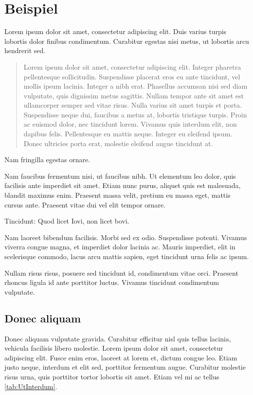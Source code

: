 \chapter{Beispiel} \label{ch:Beispiel}
Lorem ipsum dolor sit amet, consectetur adipiscing elit. Duis varius turpis lobortis dolor finibus condimentum. Curabitur egestas nisi metus, ut lobortis arcu hendrerit sed. 
\begin{quote}Lorem ipsum dolor sit amet, consectetur adipiscing elit. Integer pharetra pellentesque sollicitudin. Suspendisse placerat eros eu ante tincidunt, vel mollis ipsum lacinia. Integer a nibh erat. Phasellus accumsan nisi sed diam vulputate, quis dignissim metus sagittis. Nullam tempor ante sit amet est ullamcorper semper sed vitae risus. Nulla varius sit amet turpis et porta. Suspendisse neque dui, faucibus a metus at, lobortis tristique turpis. Proin ac euismod dolor, nec tincidunt lorem. Vivamus quis interdum elit, non dapibus felis. Pellentesque eu mattis neque. Integer eu eleifend ipsum. Donec ultricies porta erat, molestie eleifend augue tincidunt at.\end{quote}
Nam fringilla egestas ornare. 

Nam faucibus fermentum nisi, ut faucibus nibh. Ut elementum leo dolor, quis facilisis ante imperdiet sit amet. Etiam nunc purus, aliquet quis est malesuada, blandit maximus enim. Praesent massa velit, pretium eu massa eget, mattis cursus ante. Praesent vitae dui vel elit tempor ornare. 
\begin{kischt}{Tincidunt:}
Quod licet Iovi, non licet bovi.

Nam laoreet bibendum facilisis. Morbi sed ex odio. Suspendisse potenti. Vivamus viverra congue magna, et imperdiet dolor lacinia ac. Mauris imperdiet, elit in scelerisque commodo, lacus arcu mattis sapien, eget tincidunt urna felis ac ipsum.
\end{kischt}
Nullam risus risus, posuere sed tincidunt id, condimentum vitae orci. Praesent rhoncus ligula id ante porttitor luctus. Vivamus tincidunt condimentum vulputate. 

\section{Donec aliquam} \label{sec:DonecAliquam}
 Donec aliquam vulputate gravida. Curabitur efficitur nisl quis tellus lacinia, vehicula facilisis libero molestie. Lorem ipsum dolor sit amet, consectetur adipiscing elit. Fusce enim eros, laoreet at lorem et, dictum congue leo. Etiam justo neque, interdum et elit sed, porttitor fermentum augue. Curabitur molestie risus urna, quis porttitor tortor lobortis sit amet. Etiam vel mi ac tellus \ref{tab:UtInterdum}.
 
